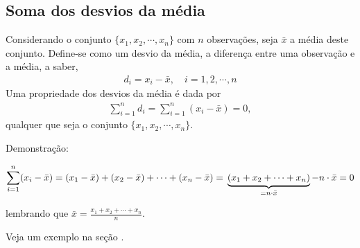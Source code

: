 \subsection{Soma dos desvios da média}

Considerando o conjunto \(\{ x_1,x_2,\cdots, x_n\}\) com \(n\) observações, seja \(\bar{x}\) a média deste conjunto.  Define-se como um desvio da média, a diferença entre uma observação e a média, a saber,
\begin{equation*}
\begin{split}d_i=x_i-\bar{x}, \quad i=1,2,\cdots, n\end{split}
\end{equation*}
Uma propriedade dos desvios da média é dada por
\begin{equation*}
\begin{split}\sum^n_{i=1}d_i=\sum^n_{i=1}(x_i-\bar{x})=0,\end{split}
\end{equation*}
qualquer que seja o conjunto \(\{ x_1,x_2,\cdots, x_n\}\).

Demonstração:

\(\displaystyle{\sum^n_{i=1}} (x_i-\bar{x})=(x_1-\bar{x})+(x_2-\bar{x})+\cdots+(x_n-\bar{x})=\\ \underbrace{(x_1+x_2+\cdots +x_n)}_{=n\cdot \bar{x}} - n\cdot \bar{x}=0\)

lembrando que \(\bar{x}=\frac{x_1+x_2+\cdots+x_n}{n}\).

Veja um exemplo na seção .


